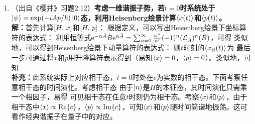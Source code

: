 \begin{enumerate}[label=\textbf{4.A\arabic*}, listparindent=\parindent]
    \item （出自《樱井》习题2.12）\textbf{考虑一维谐振子势，若$t=0$时系统处于$\ket{\psi}=\exp(-iAp/\hbar)\ket{0}$态，利用Heisenberg绘景计算$\left\langle x(t)\right\rangle$和$\left\langle p(t)\right\rangle$。}\\
    \textbf{解：}首先计算$\left[H,\,x\right]$和$\left[H,\,p\right]$：
    根据定义，可以写出Heisenberg绘景下坐标算符的表达式：
    利用恒等式$\mathrm{e}^{-\alpha\hat{A}}\hat{B}\mathrm{e}^{\alpha\hat{A}}=\sum_{n=0}^\infty\frac{\alpha^n}{n!}(-1)^n(\mathcal{L}_{\hat{A}})^n(\hat{B})$，可得
    类似地，可以得到Heisenberg绘景下动量算符的表达式：
    则$t$时刻的$\left\langle x_\mathrm{H}(t)\right\rangle$为
    最后一步可通过将$x$和$p$用升降算符表示得到（易知$\left\langle x\right\rangle=0$，$\left\langle p\right\rangle=0$）。类似地，可知
    \\
    \textbf{补充：}此系统实际上对应相干态，$t=0$时处在$c$为实数的相干态。下面考察任意相干态的时间演化。考虑相干态
    由于$\ket{n}$是$H$的本征态，其时间演化只需乘一个相因子，易得
    可见相干态在任意$t$时刻仍为相干态。考察$\left\langle x\right\rangle$和$\left\langle p\right\rangle$，由于相干态中$\left\langle x\right\rangle\propto\Re{c}$，$\left\langle p\right\rangle\propto\Im{c}$，可知$\left\langle x\right\rangle$和$\left\langle p\right\rangle$随时间简谐地振荡。这可看作经典谐振子在量子中的对应。
    

\end{enumerate}

